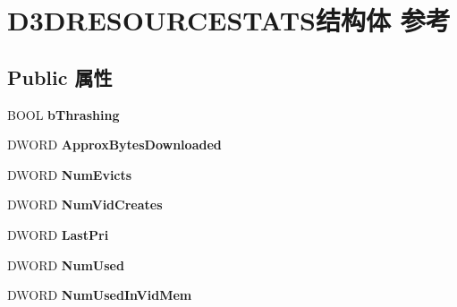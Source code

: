\hypertarget{struct_d3_d_r_e_s_o_u_r_c_e_s_t_a_t_s}{}\section{D3\+D\+R\+E\+S\+O\+U\+R\+C\+E\+S\+T\+A\+T\+S结构体 参考}
\label{struct_d3_d_r_e_s_o_u_r_c_e_s_t_a_t_s}
\subsection*{Public 属性}
\begin{DoxyCompactItemize}
\item 
\mbox{\label{struct_d3_d_r_e_s_o_u_r_c_e_s_t_a_t_s_aa725e9384b3d74b3667866f85b267620}} 
B\+O\+OL {\bfseries b\+Thrashing}
\item 
\mbox{\label{struct_d3_d_r_e_s_o_u_r_c_e_s_t_a_t_s_a618cbad0a8775689e5a45a7f108667b8}} 
D\+W\+O\+RD {\bfseries Approx\+Bytes\+Downloaded}
\item 
\mbox{\label{struct_d3_d_r_e_s_o_u_r_c_e_s_t_a_t_s_a94328c3d24bdee0a4327ffe4476fcf5d}} 
D\+W\+O\+RD {\bfseries Num\+Evicts}
\item 
\mbox{\label{struct_d3_d_r_e_s_o_u_r_c_e_s_t_a_t_s_ae20acf21a3ea8a048925f56a35cda568}} 
D\+W\+O\+RD {\bfseries Num\+Vid\+Creates}
\item 
\mbox{\label{struct_d3_d_r_e_s_o_u_r_c_e_s_t_a_t_s_a7d6c92b5f4744f8226589dfad829cb1c}} 
D\+W\+O\+RD {\bfseries Last\+Pri}
\item 
\mbox{\label{struct_d3_d_r_e_s_o_u_r_c_e_s_t_a_t_s_a39f5bd05748b54346204db395a51d301}} 
D\+W\+O\+RD {\bfseries Num\+Used}
\item 
\mbox{\label{struct_d3_d_r_e_s_o_u_r_c_e_s_t_a_t_s_a145449bc975a0305328cf2a001860505}} 
D\+W\+O\+RD {\bfseries Num\+Used\+In\+Vid\+Mem}
\item 
\mbox{\label{struct_d3_d_r_e_s_o_u_r_c_e_s_t_a_t_s_a9e58730ee4770b301a11a5ddccf23afa}} 

\end{DoxyCompactItemize}
